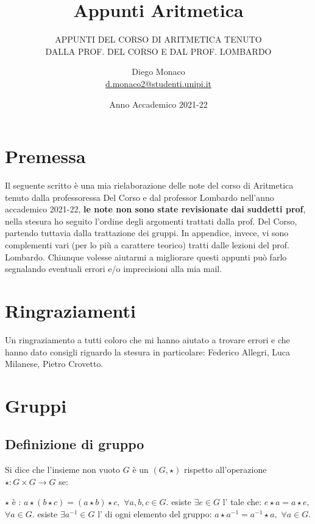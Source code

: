 \documentclass[11pt]{scrartcl}
\begin{document}
\title{Appunti Aritmetica}
\subtitle{\large\normalfont\rmfamily\scshape APPUNTI DEL CORSO DI ARITMETICA TENUTO\\ DALLA PROF. DEL CORSO E DAL PROF. LOMBARDO}
\author{Diego Monaco \\ \textnormal{\href{d.monaco2@studenti.unipi.it}{d.monaco2@studenti.unipi.it}}}
\date{Anno Accademico 2021-22}
\maketitle
\newpage

\section*{Premessa}
Il seguente scritto è una mia rielaborazione delle note del corso di Aritmetica tenuto dalla professoressa Del Corso e dal professor Lombardo nell'anno accademico 
2021-22, \textbf{le note non sono state revisionate dai suddetti prof}, nella stesura ho seguito l'ordine degli argomenti trattati dalla prof. Del Corso, partendo tuttavia
dalla trattazione dei gruppi. In appendice, invece, vi sono complementi vari (per lo più a carattere teorico) tratti dalle lezioni del prof. Lombardo. Chiunque volesse aiutarmi a migliorare questi appunti 
può farlo segnalando eventuali errori e/o imprecisioni alla mia mail.

\section*{Ringraziamenti}
Un ringraziamento a tutti coloro che mi hanno aiutato a trovare errori e che hanno dato consigli riguardo la stesura in particolare: Federico Allegri, 
Luca Milanese, Pietro Crovetto.
\newpage

\tableofcontents
\eject


\newpage
\section{Gruppi}
\subsection{Definizione di gruppo}
\begin{definition}
	Si dice che l'insieme non vuoto $G$ è un  $(G,\star)$ rispetto all'operazione $\star: G \times G \rightarrow G$ se:
	\begin{itemize}
		\ii $\star$ è : $a \star (b \star c)=(a \star b) \star c,$ $\forall a,b,c \in G$.
		\ii esiste $\exists e \in G$ l' tale che: $e \star a = a \star e,$ $\forall a \in G$.
		\ii esiste $\exists a^{-1} \in G$ l' di ogni elemento del gruppo: $a \star a^{-1} = a^{-1} \star a,$ $\forall a \in G$.
	\end{itemize}
\end{definition}
\end{document}
